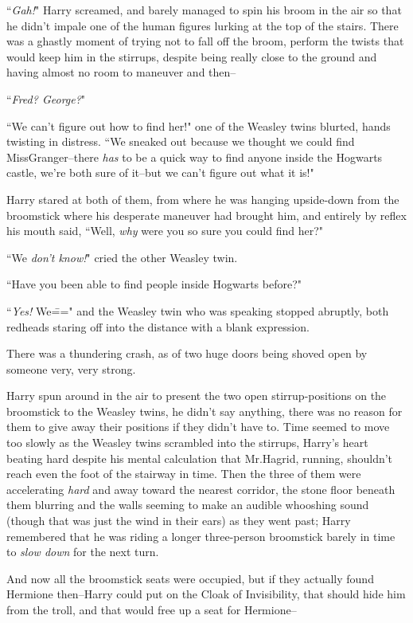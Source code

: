 ``\emph{Gah!}" Harry screamed, and barely managed to spin his broom in the air so that he didn't impale one of the human figures lurking at the top of the stairs. There was a ghastly moment of trying not to fall off the broom, perform the twists that would keep him in the stirrups, despite being really close to the ground and having almost no room to maneuver and then\---

``\emph{Fred? George?}"

``We can't figure out how to find her!" one of the Weasley twins blurted, hands twisting in distress. ``We sneaked out because we thought we could find Miss\?Granger\---there \emph{has} to be a quick way to find anyone inside the Hogwarts castle, we're both sure of it\---but we can't figure out what it is!"

Harry stared at both of them, from where he was hanging upside-down from the broomstick where his desperate maneuver had brought him, and entirely by reflex his mouth said, ``Well, \emph{why} were you so sure you could find her?"

``We \emph{don't know!}" cried the other Weasley twin.

``Have you been able to find people inside Hogwarts before?"

``\emph{Yes!} We\===" and the Weasley twin who was speaking stopped abruptly, both redheads staring off into the distance with a blank expression.

There was a thundering crash, as of two huge doors being shoved open by someone very, very strong.

Harry spun around in the air to present the two open stirrup-positions on the broomstick to the Weasley twins, he didn't say anything, there was no reason for them to give away their positions if they didn't have to. Time seemed to move too slowly as the Weasley twins scrambled into the stirrups, Harry's heart beating hard despite his mental calculation that Mr.\?Hagrid, running, shouldn't reach even the foot of the stairway in time. Then the three of them were accelerating \emph{hard} and away toward the nearest corridor, the stone floor beneath them blurring and the walls seeming to make an audible whooshing sound (though that was just the wind in their ears) as they went past; Harry remembered that he was riding a longer three-person broomstick barely in time to \emph{slow down} for the next turn.

And now all the broomstick seats were occupied, but if they actually found Hermione then\---Harry could put on the Cloak of Invisibility, that should hide him from the troll, and that would free up a seat for Hermione\---

